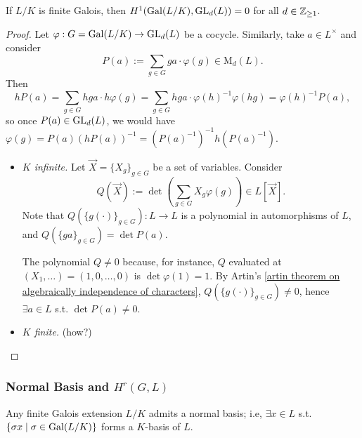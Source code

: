 \begin{theorem}[Hilbert 90]\label{Hilbert 90 - H1(Gal GL) = 0}
    If $L/K$ is finite Galois, then $H^1(\operatorname{Gal}(L/K), \operatorname{GL}_d(L)) = 0$ for all $d\in\mathbb{Z}_{\ge 1}$.
\end{theorem}
\begin{proof}
    Let $\varphi : G = \operatorname{Gal}(L/K)\to \operatorname{GL}_d(L)$ be a cocycle.
    Similarly, take $a\in L^\times$ and consider \[P(a) := \sum_{g\in G} ga\cdot \varphi(g)\in \mathrm{M}_d(L).\]
    Then \[hP(a) = \sum_{g\in G} hga\cdot h\varphi(g)
    = \sum_{g\in G} hga\cdot \varphi(h)^{-1}\varphi(hg) = \varphi(h)^{-1}P(a),\]
    so once $P(a)\in \operatorname{GL}_d(L)$,
    we would have $\varphi(g) = P(a)\left( hP(a ) \right)^{-1} = \left( P(a)^{-1} \right)^{-1}h(P(a)^{-1})$.
\begin{itemize}
\item \textit{$K$ infinite.}
Let $\vec{X} = \{X_g\}_{g\in G}$ be a set of variables. Consider \[
Q(\vec{X}) := \det\left( \sum_{g\in G}X_g\varphi(g) \right)\in L[\vec{X}].\]
Note that $Q(\{g(\cdot )\}_{g\in G}) : L\to L$ is a polynomial in automorphisms of $L$, and $Q(\{ga\}_{g\in G}) = \det P(a)$.

The polynomial $Q\ne 0$ because, for instance,
$Q$ evaluated at $(X_1, \dots) = (1, 0, \dots, 0)$ is
$\det \varphi(1) = 1$.
By Artin's \cref{artin theorem on algebraically independence of characters},
$Q(\{g(\cdot )\}_{g\in G})\ne 0$, hence $\exists a\in L$ s.t. $\det P(a)\ne 0$.

\item \textit{$K$ finite.}
(how?)

\end{itemize}


\end{proof}

\subsubsection{Normal Basis and \texorpdfstring{$H^r(G, L)$}{Hr(G, L)}}

\begin{theorem}\label{normal basis theorem for finite galois}
    Any finite Galois extension $L/K$ admits a normal basis; i.e, $\exists x\in L$ s.t. $\{\sigma x\mid \sigma\in\operatorname{Gal}(L/K)\}$ forms a $K$-basis of $L$.
\end{theorem}

